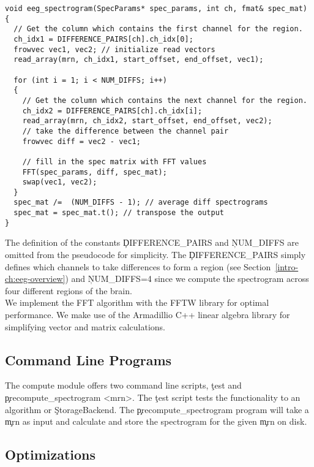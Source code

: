 \begin{lstlisting}
void eeg_spectrogram(SpecParams* spec_params, int ch, fmat& spec_mat)
{
  // Get the column which contains the first channel for the region.
  ch_idx1 = DIFFERENCE_PAIRS[ch].ch_idx[0];
  frowvec vec1, vec2; // initialize read vectors
  read_array(mrn, ch_idx1, start_offset, end_offset, vec1);

  for (int i = 1; i < NUM_DIFFS; i++)
  {
    // Get the column which contains the next channel for the region.
    ch_idx2 = DIFFERENCE_PAIRS[ch].ch_idx[i];
    read_array(mrn, ch_idx2, start_offset, end_offset, vec2);
    // take the difference between the channel pair
    frowvec diff = vec2 - vec1;

    // fill in the spec matrix with FFT values
    FFT(spec_params, diff, spec_mat);
    swap(vec1, vec2);
  }
  spec_mat /=  (NUM_DIFFS - 1); // average diff spectrograms
  spec_mat = spec_mat.t(); // transpose the output
}
\end{lstlisting}

The definition of the constants \c{DIFFERENCE\_PAIRS} and \c{NUM\_DIFFS} are
omitted from the pseudocode for simplicity. The \c{DIFFERENCE\_PAIRS} simply
defines which channels to take differences to form a region (see
Section~\ref{intro-ch:eeg-overview}) and \c{NUM\_DIFFS=4} since we
compute the spectrogram across four different regions of the brain. \\

We implement the FFT algorithm with the FFTW library \cite{fftw} for optimal
performance. We make use of the Armadillio C++ linear algebra library
\cite{arma} for simplifying vector and matrix calculations.

\subsection{Command Line Programs}\label{compute-ch:implementation-cmd}

The compute module offers two command line scripts, \c{test} and
\c{precompute\_spectrogram <mrn>}. The \c{test} script tests the functionality
to an algorithm or \c{StorageBackend}. The \c{precompute\_spectrogram} program
will take a \c{mrn} as input and calculate and store the spectrogram for the
given \c{mrn} on disk.

\subsection{Optimizations}

